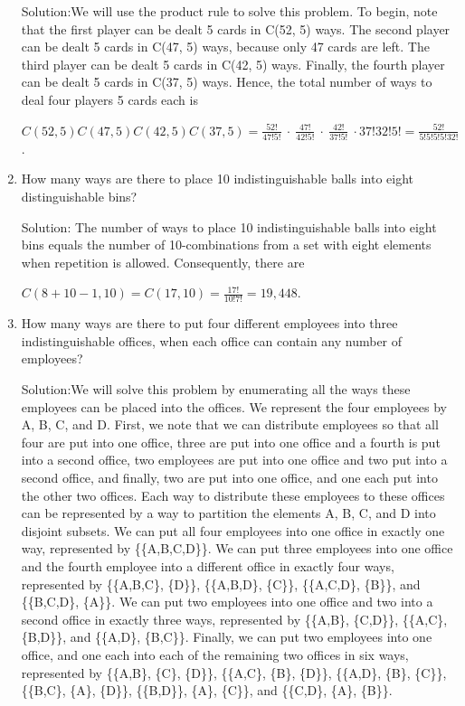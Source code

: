 \documentclass[11pt,a4paper]{book}
\begin{document}
\begin{enumerate}[label=Example~\arabic*]
Solution:We will use the product rule to solve this problem.
To begin, note that the first player can be dealt 5 cards in C(52, 5) ways.
The second player can be dealt 5 cards in C(47, 5) ways, because only 47 cards are left.
The third player can be dealt 5 cards in C(42, 5) ways.
Finally, the fourth player can be dealt 5 cards in C(37, 5) ways.
Hence, the total number of ways to deal four players 5 cards each is 

$C(52, 5)C(47, 5)C(42, 5)C(37, 5) = \frac{52!}{47!5!}~\cdot~\frac{47!}{42!5!}~\cdot~\frac{42!}{37!5!}~\cdot{37!}{32!5!} = \frac{52!}{5!5!5!5!32!}$ .

\item How many ways are there to place 10 indistinguishable balls into eight distinguishable bins?

Solution: The number of ways to place 10 indistinguishable balls into eight bins equals the number of 10-combinations from a set with eight elements when repetition is allowed.
Consequently, there are

$C(8 + 10 - 1, 10) = C(17, 10) = \frac{17!}{10!7!} = 19,448$.

\item How many ways are there to put four different employees into three indistinguishable offices, when each office can contain any number of employees?

Solution:We will solve this problem by enumerating all the ways these employees can be placed into the offices.
We represent the four employees by A, B, C, and D.
First, we note that we can distribute employees so that all four are put into one office, three are put into one office and a fourth is put into a second office, two employees are put into one office and two put into a second office, and finally, two are put into one office, and one each put into the other two offices.
Each way to distribute these employees to these offices can be represented by a way to partition the elements A, B, C, and D into disjoint subsets.
We can put all four employees into one office in exactly one way, represented by \{\{A,B,C,D\}\}.
We can put three employees into one office and the fourth employee into a different office in exactly four ways, represented by \{\{A,B,C\}, \{D\}\}, \{\{A,B,D\}, \{C\}\}, \{\{A,C,D\}, \{B\}\}, and \{\{B,C,D\}, \{A\}\}.
We can put two employees into one office and two into a second office in exactly three ways, represented by \{\{A,B\}, \{C,D\}\}, \{\{A,C\}, \{B,D\}\}, and \{\{A,D\}, \{B,C\}\}.
Finally, we can put two employees into one office, and one each into each of the remaining two offices in six ways, represented by \{\{A,B\}, \{C\}, \{D\}\}, \{\{A,C\}, \{B\}, \{D\}\}, \{\{A,D\}, \{B\}, \{C\}\}, \{\{B,C\}, \{A\}, \{D\}\}, \{\{B,D\}\}, \{A\}, \{C\}\}, and \{\{C,D\}, \{A\}, \{B\}\}.


\end{enumerate}
\end{document}
